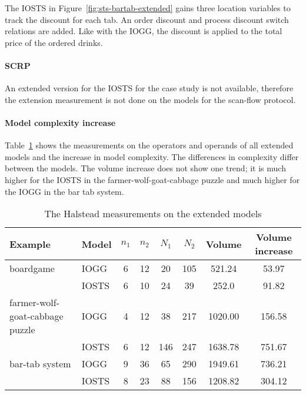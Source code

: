 The IOSTS in Figure~\ref{fig:sts-bartab-extended} gains three location variables to track the discount for each tab. An order discount and process discount switch relations are added. Like with the IOGG, the discount is applied to the total price of the ordered drinks.

\paragraph*{SCRP}
An extended version for the IOSTS for the case study is not available, therefore the extension measurement is not done on the models for the scan-flow protocol.

\paragraph*{Model complexity increase}
Table~\ref{tab:halstead-extended} shows the measurements on the operators and operands of all extended models and the increase in model complexity. The differences in complexity differ between the models. The volume increase does not show one trend; it is much higher for the IOSTS in the farmer-wolf-goat-cabbage puzzle and much higher for the IOGG in the bar tab system.

\begin{table}[ht]
\begin{center}
\begin{tabular}{| l | l | c | c | c | c | c | c |}
  \hline
  \textbf{Example} & \textbf{Model} & $n_1$ & $n_2$ & $N_1$ & $N_2$ & Volume & Volume increase \\ \hline
  boardgame & IOGG & 6 & 12 & 20 & 105 & 521.24 & 53.97 \\
  & IOSTS & 6 & 10 & 24 & 39 & 252.0 & 91.82\\ \hline
  farmer-wolf-goat-cabbage puzzle & IOGG & 4 & 12 & 38 & 217 & 1020.00 & 156.58\\ 
  & IOSTS & 6 & 12 & 146 & 247 & 1638.78 & 751.67\\ \hline
  bar-tab system & IOGG & 9 & 36 & 65 & 290 & 1949.61 & 736.21\\
  & IOSTS & 8 & 23 & 88 & 156 & 1208.82 & 304.12\\
  \hline
\end{tabular}
\end{center}
\caption{The Halstead measurements on the extended models}
\label{tab:halstead-extended}
\end{table}


